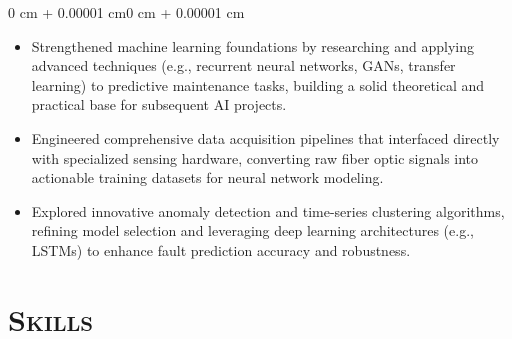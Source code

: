 \documentclass[10pt, letterpaper]{article}
\newenvironment{highlights}{
    \begin{itemize}[
        topsep=0.10 cm,
        parsep=0.10 cm,
        partopsep=0pt,
        itemsep=0pt,
        leftmargin=0.4 cm + 10pt
    ]
}{
    \end{itemize}
}
\newenvironment{onecolentry}{
    \begin{adjustwidth}{0 cm + 0.00001 cm}{0 cm + 0.00001 cm}
}{
    \end{adjustwidth}
}
\begin{document}
\vspace{0.10 cm}
\begin{onecolentry}
    \begin{highlights}
        \item Strengthened machine learning foundations by researching and applying advanced techniques (e.g., recurrent neural networks, GANs, transfer learning) to predictive maintenance tasks, building a solid theoretical and practical base for subsequent AI projects.
        \item Engineered comprehensive data acquisition pipelines that interfaced directly with specialized sensing hardware, converting raw fiber optic signals into actionable training datasets for neural network modeling.
        \item Explored innovative anomaly detection and time-series clustering algorithms, refining model selection and leveraging deep learning architectures (e.g., LSTMs) to enhance fault prediction accuracy and robustness.
    \end{highlights}
\end{onecolentry}


\section{\scshape Skills}

\vspace{0.2 cm}
\end{document}
